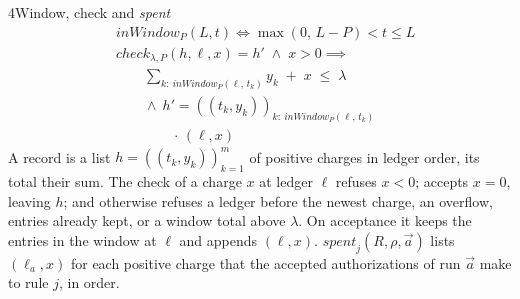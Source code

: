 \begin{perchdefinition}{4}{Window, check and \emph{spent}}\label{def:window-check-and-spent}
\[\begin{aligned}&\mathit{inWindow}_P(L, t) \iff \max(0,\, L - P) < t \le L\\
&\mathit{check}_{\lambda, P}(h, \ell, x) = h' \;\land\; x > 0 \implies\\
&\qquad \sum_{k:\ \mathit{inWindow}_P(\ell,\, t_k)} y_k \;+\; x \;\le\; \lambda\\
&\qquad \land\ h' = ((t_k, y_k))_{k:\ \mathit{inWindow}_P(\ell,\, t_k)}\\
&\qquad\qquad \cdot\, (\ell, x)\end{aligned}\]
A record is a list \(h = ((t_k, y_k))_{k=1}^{m}\) of positive charges in ledger order, its total their sum. The check of a charge \(x\) at ledger \(\ell\) refuses \(x < 0\); accepts \(x = 0\), leaving \(h\); and otherwise refuses a ledger before the newest charge, an overflow,  entries already kept, or a window total above \(\lambda\). On acceptance it keeps the entries in the window at \(\ell\) and appends \((\ell, x)\). \(\mathit{spent}_j(R, \rho, \vec a)\) lists \((\ell_a, x)\) for each positive charge that the accepted authorizations of run \(\vec a\) make to rule \(j\), in order.
\end{perchdefinition}
